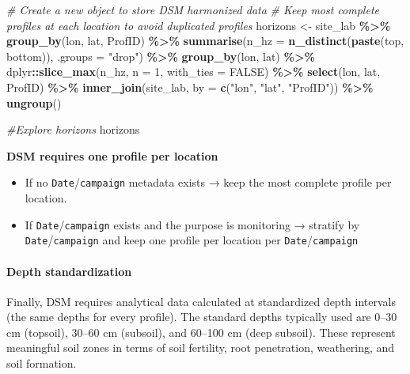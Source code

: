 \documentclass[
  10pt,
  b5paper,
  oneside]{book}
\newenvironment{Shaded}{\begin{snugshade}}{\end{snugshade}}
\newcommand{\AttributeTok}[1]{\textcolor[rgb]{0.13,0.29,0.53}{#1}}
\newcommand{\CommentTok}[1]{\textcolor[rgb]{0.56,0.35,0.01}{\textit{#1}}}
\newcommand{\ConstantTok}[1]{\textcolor[rgb]{0.56,0.35,0.01}{#1}}
\newcommand{\DecValTok}[1]{\textcolor[rgb]{0.00,0.00,0.81}{#1}}
\newcommand{\FunctionTok}[1]{\textcolor[rgb]{0.13,0.29,0.53}{\textbf{#1}}}
\newcommand{\NormalTok}[1]{#1}
\newcommand{\OtherTok}[1]{\textcolor[rgb]{0.56,0.35,0.01}{#1}}
\newcommand{\SpecialCharTok}[1]{\textcolor[rgb]{0.81,0.36,0.00}{\textbf{#1}}}
\newcommand{\StringTok}[1]{\textcolor[rgb]{0.31,0.60,0.02}{#1}}
\begin{document}
\begin{Shaded}
\begin{Highlighting}[]
\CommentTok{\# Create a new object to store DSM harmonized data}
\CommentTok{\# Keep most complete profiles at each location to avoid duplicated profiles  }
\NormalTok{horizons }\OtherTok{\textless{}{-}}\NormalTok{ site\_lab }\SpecialCharTok{\%\textgreater{}\%}
  \FunctionTok{group\_by}\NormalTok{(lon, lat, ProfID) }\SpecialCharTok{\%\textgreater{}\%}
  \FunctionTok{summarise}\NormalTok{(}\AttributeTok{n\_hz =} \FunctionTok{n\_distinct}\NormalTok{(}\FunctionTok{paste}\NormalTok{(top, bottom)), }\AttributeTok{.groups =} \StringTok{"drop"}\NormalTok{) }\SpecialCharTok{\%\textgreater{}\%}
  \FunctionTok{group\_by}\NormalTok{(lon, lat) }\SpecialCharTok{\%\textgreater{}\%}
\NormalTok{  dplyr}\SpecialCharTok{::}\FunctionTok{slice\_max}\NormalTok{(n\_hz, }\AttributeTok{n =} \DecValTok{1}\NormalTok{, }\AttributeTok{with\_ties =} \ConstantTok{FALSE}\NormalTok{) }\SpecialCharTok{\%\textgreater{}\%}
  \FunctionTok{select}\NormalTok{(lon, lat, ProfID) }\SpecialCharTok{\%\textgreater{}\%}
  \FunctionTok{inner\_join}\NormalTok{(site\_lab, }\AttributeTok{by =} \FunctionTok{c}\NormalTok{(}\StringTok{"lon"}\NormalTok{, }\StringTok{"lat"}\NormalTok{, }\StringTok{"ProfID"}\NormalTok{)) }\SpecialCharTok{\%\textgreater{}\%}
  \FunctionTok{ungroup}\NormalTok{()}

\CommentTok{\#Explore horizons}
\NormalTok{horizons}
\end{Highlighting}
\end{Shaded}

\textbf{DSM requires one profile per location}

\begin{itemize}
\item
  If no \texttt{Date}/\texttt{campaign} metadata exists → keep the most complete profile per location.
\item
  If \texttt{Date}/\texttt{campaign} exists and the purpose is monitoring → stratify by \texttt{Date}/\texttt{campaign} and keep one profile per location per \texttt{Date}/\texttt{campaign}
\end{itemize}

\paragraph*{Depth standardization}\label{depth-standardization}

Finally, DSM requires analytical data calculated at standardized depth intervals (the same depths for every profile). The standard depths typically used are 0--30 cm (topsoil), 30--60 cm (subsoil), and 60--100 cm (deep subsoil). These represent meaningful soil zones in terms of soil fertility, root penetration, weathering, and soil formation.
\end{document}
